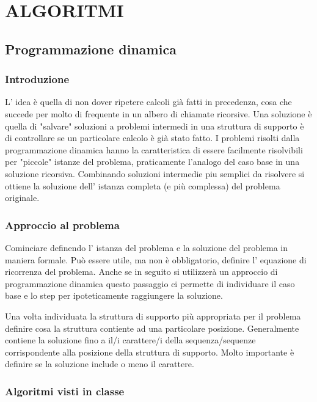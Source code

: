 \documentclass[11pt]{article}
\author{Aurelio}
\date{\today}
\title{}
\begin{document}
\tableofcontents

\section{ALGORITMI}
\label{sec:org7bd27b3}

\subsection{Programmazione dinamica}
\label{sec:orge0c66d9}

\subsubsection{Introduzione}
\label{sec:org639cb23}

L' idea è quella di non dover ripetere calcoli già fatti in precedenza, cosa che succede per 
molto di frequente in un albero di chiamate ricorsive.
Una soluzione è quella di "salvare" soluzioni a problemi intermedi in una struttura di supporto
è di controllare se un particolare calcolo è già stato fatto.
I problemi risolti dalla programmazione dinamica hanno la caratteristica di essere facilmente
risolvibili per "piccole" istanze del problema, praticamente l'analogo del caso base in una soluzione ricorsiva.
Combinando soluzioni intermedie piu semplici da risolvere si ottiene la soluzione dell' istanza completa (e più complessa)
del problema originale.


\subsubsection{Approccio al problema}
\label{sec:org6d4d4ab}

Cominciare definendo l' istanza del problema e la soluzione del problema in maniera formale.
Può essere utile, ma non è obbligatorio, definire l' equazione di ricorrenza del problema.
Anche se in seguito si utilizzerà un approccio di programmazione dinamica questo passaggio ci permette di 
individuare il caso base e lo step per ipoteticamente raggiungere la soluzione.

Una volta individuata la struttura di supporto più appropriata per il problema definire cosa
la struttura contiente ad una particolare posizione.
Generalmente contiene la soluzione fino a il/i carattere/i della sequenza/sequenze corrispondente alla
posizione della struttura di supporto. Molto importante è definire se la soluzione include o meno il carattere.


\subsubsection{Algoritmi visti in classe}
\label{sec:org30abaaf}
\end{document}
